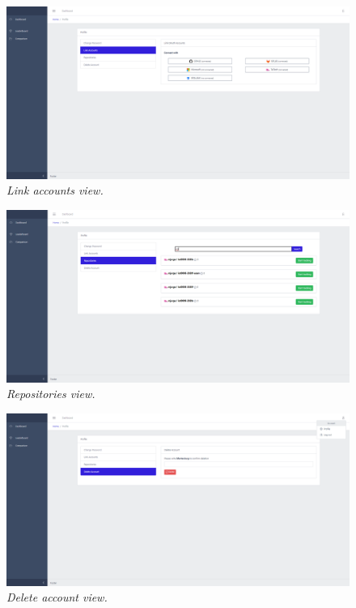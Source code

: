 \begin{figure}[ht]
    \centering
    \includegraphics[width=1\textwidth]{figures/views/link_accounts}
    \caption{\textit{Link accounts view.}}
    \label{fig:link_accounts}
\end{figure}

\begin{figure}[ht]
    \centering
    \includegraphics[width=1\textwidth]{figures/views/repositories}
    \caption{\textit{Repositories view.}}
    \label{fig:repositories}
\end{figure}

\begin{figure}[ht]
    \centering
    \includegraphics[width=1\textwidth]{figures/views/delete_account}
    \caption{\textit{Delete account view.}}
    \label{fig:delete_account}
\end{figure}
